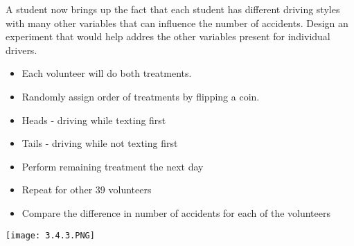 \documentclass[../stats.tex]{subfiles}
\begin{document}
\begin{example}
    A student now brings up the fact that each student has different driving styles with many other variables that can influence the number of accidents. Design an experiment that would help addres the other variables present for individual drivers.

    \begin{itemize}
        \item Each volunteer will do both treatments.
        \item Randomly assign order of treatments by flipping a coin.
        \item Heads - driving while texting first 
        \item Tails - driving while not texting first 
        \item Perform remaining treatment the next day 
        \item Repeat for other 39 volunteers 
        \item Compare the difference in number of accidents for each of the volunteers 
    \end{itemize}

    \begin{center}
        \texttt{[image: 3.4.3.PNG]}
    \end{center}
\end{example}
\end{document}
